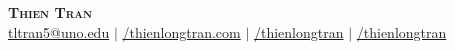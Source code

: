 \documentclass[letterpaper,11pt]{article}
\begin{document}
\def \linkedinicon {\faLinkedin}
\def \linkedinlink {https://www.linkedin.com/in/thienlongtran}
\def \linkedintext {/thienlongtran}

\def \emailicon {\faEnvelope}
\def \emaillink {mailto:tltran5@uno.edu}
\def \emailtext {tltran5@uno.edu}

\def \githubicon {\faGithub}
\def \githublink {https://github.com/thienlongtran}
\def \githubtext {/thienlongtran}

\def \websiteicon {\faGlobe}
\def \websitelink {https://www.thienlongtran.com/}
\def \websitetext {/thienlongtran.com}


\def \linkedin {\linkedinicon\hspace{3pt}\textcolor{LinkColor}{\href{\linkedinlink}{\linkedintext}}}
\def \email {\emailicon\hspace{3pt}\textcolor{LinkColor}{\href{\emaillink}{\emailtext}}}
\def \github {\githubicon \hspace{3pt}\textcolor{LinkColor}{\href{\githublink}{\githubtext}}}
\def \website {\websiteicon\hspace{3pt}\textcolor{LinkColor}{\href{\websitelink}{\websitetext}}}



\begin{center}
    \textbf{\Huge \scshape Thien Tran} \\ \vspace{1pt}
    {\email} $|$ 
    {\website} $|$
    {\linkedin} $|$
    {\github}
\end{center}


\end{document}
